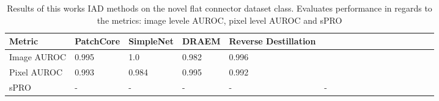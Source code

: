 \begin{table}[htbp]
    \tiny
    \centering
    \begin{tabularx}{\textwidth}{|X|X|X|X|X|X|X|X|X|X|X|X|X|X|X|X|X|X|}%
        \hline
        \textbf{Metric} & \textbf{PatchCore} \cite{patchCore2022} & \textbf{SimpleNet} \cite{liu2023simplenet} & \textbf{DRAEM} \cite{Zavrtanik_2021DRAEM} & \textbf{Reverse Destillation} \cite{revdist2023} \\
        \hline
        Image AUROC & 0.995 & 1.0 & 0.982 & 0.996 \\
        \hline
        Pixel AUROC & 0.993 & 0.984 & 0.995 & 0.992 \\
        \hline
        sPRO & - & - & - & - & - \\
        \hline
    \end{tabularx}
    \caption{Results of this works IAD methods on the novel flat connector dataset class. Evaluates performance in regards to the metrics: image levele AUROC, pixel level AUROC and sPRO}
    \label{tab:flatconnectorperformance}
\end{table}
